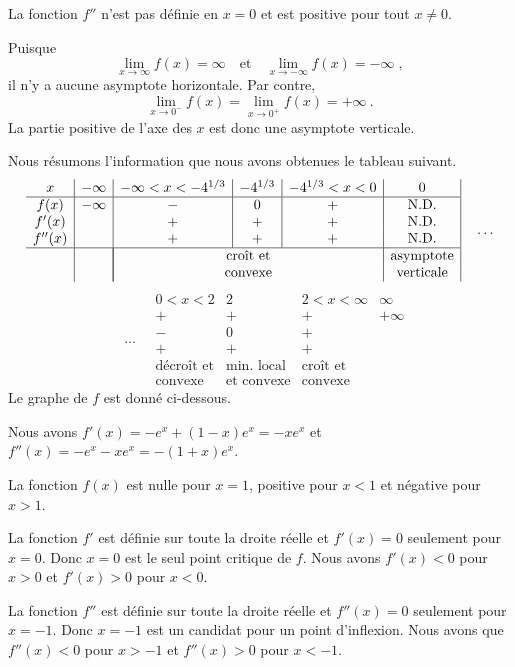 {La fonction $f''$ n'est pas définie en $x=0$ et est positive pour tout
$x\neq 0$.

Puisque
\[
\lim_{x\rightarrow \infty} f(x) = \infty  \quad \text{et} \quad
\lim_{x\rightarrow -\infty} f(x) = -\infty \; ,
\]
il n'y a aucune asymptote horizontale.  Par contre,
\[
\lim_{x\rightarrow 0^-} f(x) = \lim_{x\to 0^+} f(x) = +\infty  \ .
\]
La partie positive de l'axe des $x$ est donc une asymptote verticale.

Nous résumons l'information que nous avons obtenues le tableau suivant.
\[
\begin{array}{c|c|c|c|c|c|}
x & -\infty & -\infty<x<-4^{1/3} & -4^{1/3} & -4^{1/3}<x<0 & 0 \\
\hline
f(x) & -\infty & - & 0 & + & \text{N.D.} \\
f'(x) & & + & + & + & \text{N.D.} \\
f''(x) &  & + & + & + & \text{N.D.} \\
\hline
& & \multicolumn{3}{|c|}{\text{croît et}} & \text{asymptote} \\
& & \multicolumn{3}{|c|}{\text{convexe}} & \text{verticale}
\end{array} \quad \ldots
\]
\[ \quad \ldots  \quad
\begin{array}{|c|c|c|c}
 0<x<2 & 2 & 2<x<\infty & \infty \\
\hline
+ & + & + & +\infty \\
- & 0 & + & \\
+ & + & + & \\
\hline
\text{décroît et} & \text{min. local} & \text{croît et} & \\
\text{convexe} & \text{et convexe} & \text{convexe} &
\end{array}
\]
Le graphe de $f$ est donné ci-dessous.

 Nous avons $\displaystyle f'(x) = -e^x + (1-x)e^x = - x e^x$ et
$\displaystyle f''(x) = - e^x - x e^x = -(1+x)e^x$.

La fonction $f(x)$ est nulle pour $x=1$, positive pour $x<1$ et
négative pour $x>1$.

La fonction $f'$ est définie sur toute la droite réelle et $f'(x)=0$
seulement pour $x=0$.  Donc $x=0$ est le seul point critique de $f$.
Nous avons $f'(x) < 0$ pour $x>0$ et $f'(x) >0$ pour $x<0$.

La fonction $f''$ est définie sur toute la droite réelle et $f''(x) = 0$
seulement pour $x=-1$.  Donc $x=-1$ est un candidat pour un point
d'inflexion.  Nous avons que $f''(x) < 0$ pour $x>-1$ et $f''(x)>0$ pour $x<-1$.

}
